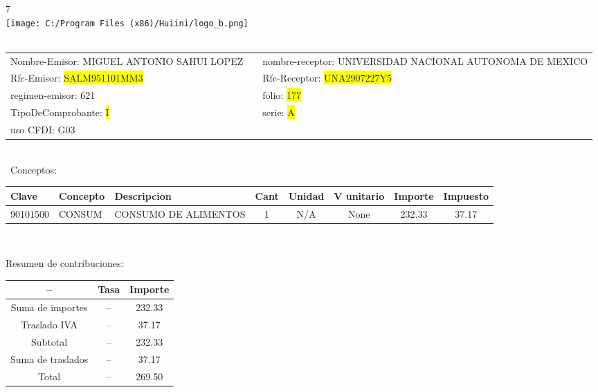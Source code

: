 \documentclass{article}
\begin{document}
\hspace{18cm} 7\\
\texttt{[image: C:/Program Files (x86)/Huiini/logo\_b.png]}
\bigskip\\\
\begin{tabular}{p{11cm}p{1cm}p{8cm}}

Nombre-Emisor: MIGUEL ANTONIO SAHUI LOPEZ && nombre-receptor: UNIVERSIDAD NACIONAL AUTONOMA DE MEXICO\\

Rfc-Emisor: \colorbox{yellow}{ SALM951101MM3 } & & Rfc-Receptor: \colorbox{yellow}{ UNA2907227Y5 }\\

regimen-emisor: 621 & & folio: \colorbox{yellow}{ 177 }\\

TipoDeComprobante: \colorbox{yellow}{ I } & & serie: \colorbox{yellow}{ A }\\

uso CFDI: G03\\



\end{tabular}
\bigskip\bigskip\bigskip\\\
Conceptos:\\
\begin{tabular}{|p{1.5cm}|p{3.6cm}|p{3.6cm}|c|c|c|c|c|}
\hline
Clave & Concepto & Descripcion & Cant & Unidad & V unitario & Importe & Impuesto \\
\hline

90101500 & CONSUM & CONSUMO DE ALIMENTOS & 1 & N/A & None & 232.33 &  37.17 \\
\hline

\end{tabular}\\
\bigskip
\begin{center}
Resumen de contribuciones:\\
\bigskip
\begin{tabular}{|c|c|c|}
\hline
 -- & Tasa & Importe\\
\hline

Suma de importes & -- & 232.33 \\
\hline

Traslado IVA & -- & 37.17 \\
\hline

Subtotal  & -- & 232.33 \\
\hline

Suma de traslados & -- & 37.17 \\
\hline

Total  & -- & 269.50 \\
\hline

\end{tabular}
\end{center}
\end{document}
